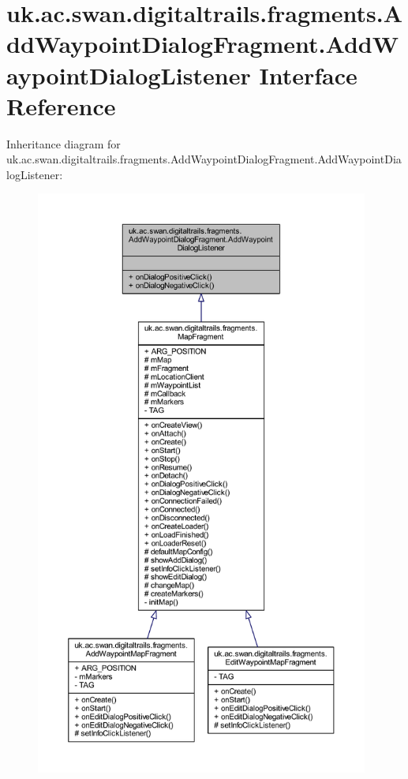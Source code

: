 \hypertarget{interfaceuk_1_1ac_1_1swan_1_1digitaltrails_1_1fragments_1_1_add_waypoint_dialog_fragment_1_1_add_waypoint_dialog_listener}{\section{uk.\+ac.\+swan.\+digitaltrails.\+fragments.\+Add\+Waypoint\+Dialog\+Fragment.\+Add\+Waypoint\+Dialog\+Listener Interface Reference}
\label{interfaceuk_1_1ac_1_1swan_1_1digitaltrails_1_1fragments_1_1_add_waypoint_dialog_fragment_1_1_add_waypoint_dialog_listener}
}


Inheritance diagram for uk.\+ac.\+swan.\+digitaltrails.\+fragments.\+Add\+Waypoint\+Dialog\+Fragment.\+Add\+Waypoint\+Dialog\+Listener\+:
\nopagebreak
\begin{figure}[H]
\begin{center}
\leavevmode
\includegraphics[height=550pt]{interfaceuk_1_1ac_1_1swan_1_1digitaltrails_1_1fragments_1_1_add_waypoint_dialog_fragment_1_1_addb822b4004222eae83d00e69412923168}
\end{center}
\end{figure}



